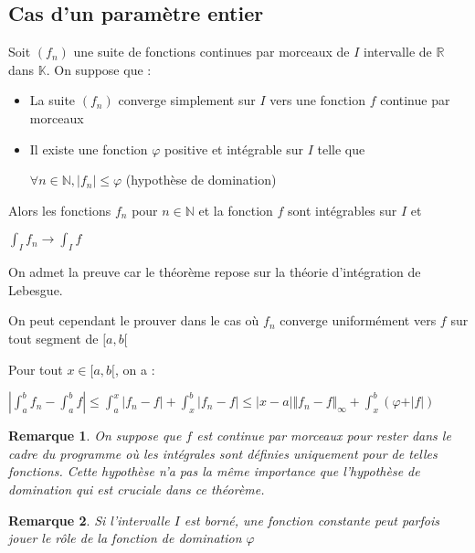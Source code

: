 \documentclass[a4paper,12pt]{book}
\newcommand{\Thr}[2]{\begin{tcolorbox}[sharp corners, colback=white,colframe=red!90!black!75, title=Théorème : #1]#2\end{tcolorbox}}
\newcommand{\Pre}[1]{\begin{tcolorbox}[sharp corners, colback=white,colframe=green!60!green!30!black!75, title=Preuve]#1\end{tcolorbox}}
\newtheorem{Rem}{Remarque}[section]
\def\R{\mathbb{R}}
\def\N{\mathbb{N}}
\def\K{\mathbb{K}}
\begin{document}
\subsection{Cas d'un paramètre entier}
\Thr{de convergence dominée}{Soit $(f_n)$ une suite de fonctions continues par morceaux de $I$ intervalle de $\R$ dans $\K$. On suppose que :\begin{itemize}
\item La suite $(f_n)$ converge simplement sur $I$ vers une fonction $f$ continue par morceaux
\item Il existe une fonction $\varphi$ positive et intégrable sur $I$ telle que \par\begin{center}$\forall n\in\N, \vert f_n\vert\leq\varphi$ (hypothèse de domination)\end{center}
\end{itemize}
Alors les fonctions $f_n$ pour $n\in\N$ et la fonction $f$ sont intégrables sur $I$ et \par\begin{center}$\int_If_n\to\int_If$\end{center}}
\Pre{On admet la preuve car le théorème repose sur la théorie d'intégration de Lebesgue. \par On peut cependant le prouver dans le cas où $f_n$ converge uniformément vers $f$ sur tout segment de $[a,b[$ \par Pour tout $x\in[a,b[$, on a :\par $\left\vert\int_a^bf_n -\int_a^bf\right\vert\leq \int_a^x\vert f_n-f\vert + \int_x^b\vert f_n-f\vert\leq \vert x-a\vert\Vert f_n-f\Vert_\infty +\int_x^b(\varphi+\vert f\vert)$}
\begin{Rem}
On suppose que $f$ est continue par morceaux pour rester dans le cadre du programme où les intégrales sont définies uniquement pour de telles fonctions. Cette hypothèse n'a pas la même importance que l'hypothèse de domination qui est cruciale dans ce théorème.
\end{Rem}
\begin{Rem}
Si l'intervalle $I$ est borné, une fonction constante peut parfois jouer le rôle de la fonction de domination $\varphi$
\end{Rem}
\end{document}
